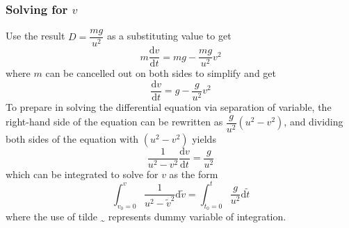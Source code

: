 \documentclass[12pt]{article}
\newcommand{\totder}[2][]{\frac{\mathrm{d}#1}{\mathrm{d}#2}} %
\newcommand{\diff}[1]{\text{d}#1}
\begin{document}
\begin{multicols}{2}
\subsubsection{Solving for $v$}
Use the result $D=\dfrac{mg}{u^2}$ as a substituting value to get
$$m\totder[v]{t}=mg-\frac{mg}{u^2}v^2$$
where $m$ can be cancelled out on both sides to simplify and get
$$\totder[v]{t}=g-\frac{g}{u^2}v^2$$
To prepare in solving the differential equation via separation of variable,
the right-hand side of the equation can be rewritten as $\dfrac{g}{u^2}(u^2-v^2)$,
and dividing both sides of the equation with $(u^2-v^2)$ yields
$$\frac{1}{u^2-v^2}\totder[v]{t}=\frac{g}{u^2}$$
which can be integrated to solve for $v$ as the form
$$\int_{v_0=0}^v\frac{1}{u^2-\tilde{v}^2}\diff{\tilde{v}}=\int_{t_0=0}^t\frac{g}{u^2}\diff{\tilde{t}}$$
where the use of tilde \textsubscript{\Large\textasciitilde} represents dummy variable of integration. %


\end{multicols}
\end{document}

